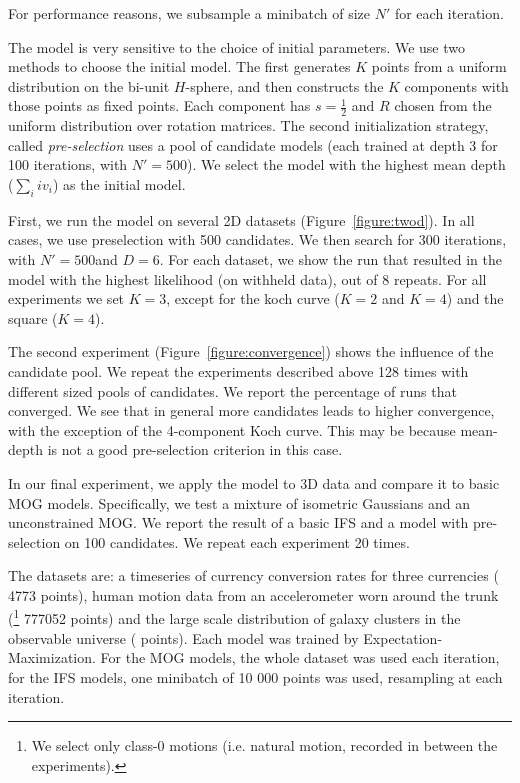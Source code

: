 \documentclass[reprint,amsmath,amssymb,aps,prl]{revtex4-1}
\begin{document}
For performance reasons, we subsample a minibatch of size $N'$ for each iteration.

The model is very sensitive to the choice of initial parameters. We use two methods to choose the initial model. The first generates $K$ points from a uniform distribution on the bi-unit $H$-sphere, and then constructs the $K$ components with those points as fixed points. Each component has $s = \frac{1}{2}$ and $R$ chosen from the uniform distribution over rotation matrices. The second initialization strategy, called \emph{pre-selection} uses a pool of candidate models (each trained at depth 3 for 100 iterations, with $N' = 500$). We select the model with the highest mean depth ($\sum_i iv_i$) as the initial model. 

First, we run the model on several 2D datasets (Figure~\ref{figure:twod}). In all cases, we use preselection with 500 candidates. We then search for 300 iterations, with $N' = 500$and $D=6$. For each dataset, we show the run that resulted in the model with the highest likelihood (on withheld data), out of 8 repeats. For all experiments we set $K=3$, except for the koch curve ($K=2$ and $K=4$) and the square ($K=4$).

The second experiment (Figure~\ref{figure:convergence}) shows the influence of the candidate pool. We repeat the experiments described above 128 times with different sized pools of candidates. We report the percentage of runs that converged. We see that in general more candidates leads to higher convergence, with the exception of the 4-component Koch curve. This may be because mean-depth is not a good pre-selection criterion in this case.

In our final experiment, we apply the model to 3D data and compare it to basic MOG models. Specifically, we test a mixture of isometric Gaussians and an unconstrained MOG. We report the result of a basic IFS and a model with pre-selection on 100 candidates. We repeat each experiment 20 times.

The datasets are: a timeseries of currency conversion rates for three currencies (\cite{franses2000non,hyndman2010time} 4773 points), human motion data from an accelerometer worn around the trunk  (\cite{bachlin2010wearable}\footnote{We select only class-0 motions (i.e. natural motion, recorded in between the experiments).} 777052 points) and the large scale distribution of galaxy clusters in the observable universe (\cite{skrutskie2006two} points). Each model was trained by Expectation-Maximization. For the MOG models, the whole dataset was used each iteration, for the IFS models, one minibatch of 10 000 points was used, resampling at each iteration.
\end{document}
